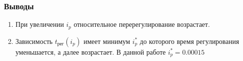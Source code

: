 \documentclass[a4paper,12pt]{article}
\begin{document}
\begin{enumerate}
                            
                \end{enumerate}
                \subsubsection{Выводы}
                \begin{enumerate}
                    \item При увеличении $i_p$ относительное перерегулирование  возрастает.
                    \item Зависимость $t_{рег}(i_p)$ имеет минимум $i^*_p$  до которого время регулирования уменьшается, а далее возрастает. В данной работе $i^*_p=0.00015$ 
                \end{enumerate}
\end{document}
